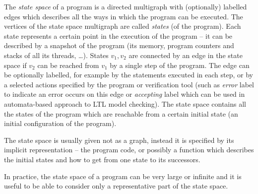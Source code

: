 \begin{definition}
The \emph{state space} of a program is a directed multigraph with (optionally) labelled edges which describes all the ways in which the program can be executed.
The vertices of the state space multigraph are called \emph{states} (of the program).
Each state represents a certain point in the execution of the program -- it can be described by a snapshot of the program (its memory, program counters and stacks of all its threads, …).
States $v_1, v_2$ are connected by an edge in the state space if $v_2$ can be reached from $v_1$ by a single step of the program.
The edge can be optionally labelled, for example by the statements executed in each step, or by a selected actions specified by the program or verification tool (such as \emph{error} label to indicate an error occurs on this edge or \emph{accepting} label which can be used in automata-based approach to LTL model checking).
The state space contains all the states of the program which are reachable from a certain initial state (an initial configuration of the program).
\end{definition}

The state space is usually given not as a graph, instead it is specified by its
implicit representation -- the program code, or possibly a function which
describes the initial states and how to get from one state to its successors.

In practice, the state space of a program can be very large or infinite and it
is useful to be able to consider only a representative part of the state space.

